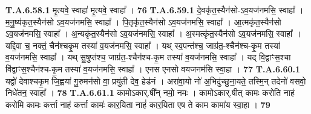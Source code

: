 \documentclass[17pt]{extarticle}
\begin{document}
                  \newline
                                                         \textbf{} \newline \newline
                                \textbf{ T.A.6.58.1} \newline
                  मृ॒त्यवे॒ स्वाहा॑ मृ॒त्यवे॒ स्वाहा᳚ । \textbf{ 76} \newline
                  \newline
                                                         \textbf{} \newline \newline
                                \textbf{ T.A.6.59.1} \newline
                  दे॒वकृ॑त॒स्यैन॑सो-ऽव॒यज॑नमसि॒ स्वाहा᳚ ।  म॒नु॒ष्य॑कृत॒स्यैन॑सो ऽव॒यज॑नमसि॒ स्वाहा᳚ ।  पि॒तृकृ॑त॒स्यैन॑सो ऽव॒यज॑नमसि॒ स्वाहा᳚ ।  आ॒त्मकृ॑त॒स्यैन॑सो ऽव॒यज॑नमसि॒ स्वाहा᳚ ।  अ॒न्यकृ॑त॒स्यैन॑सो ऽव॒यज॑नमसि॒ स्वाहा᳚ ।  अ॒स्मत्कृ॑त॒स्यैन॑सो ऽव॒यज॑नमसि॒ स्वाहा᳚ ।  यद्दि॒वा च॒ नक्तं॒ चैन॑श्चकृ॒म तस्या॑ व॒यज॑नमसि॒ स्वाहा᳚ ।  यथ् स्व॒पन्त॑श्च॒ जाग्र॑त॒-श्चैन॑श्च-कृ॒म तस्या॑ व॒यज॑नमसि॒ स्वाहा᳚ ।  यथ् सु॒षुप्त॑श्च॒ जाग्र॑त॒-श्चैन॑श्च-कृ॒म तस्या॑ व॒यज॑नमसि॒ स्वाहा᳚ ।  यद् वि॒द्वाꣳस॒श्चा वि॑द्वाꣳस॒श्चैन॑श्च-कृ॒म तस्या॑ व॒यज॑नमसि॒ स्वाहा᳚ ।  एनस एनसो वयजनम॑सि स्वा॒हा । \textbf{ 77} \newline
                  \newline
                                                         \textbf{} \newline \newline
                                \textbf{ T.A.6.60.1} \newline
                  यद्वो॑ देवाश्चकृ॒म जि॒ह्वया॑ गु॒रुमन॑सो वा॒ प्रयु॑ती देव॒ हेड॑नं ।  अरा॑वा॒यो नो॑ अ॒भिदु॑च्छुना॒यते॒ तस्मि॒न् तदेनो॑ वसवो॒ निधे॑तन॒ स्वाहा᳚ । \textbf{ 78} \newline
                  \newline
                                                         \textbf{} \newline \newline
                                \textbf{ T.A.6.61.1} \newline
                  कामोऽकार्.षी᳚न् नमो॒ नमः ।  कामोऽकार्.षीत् कामः करोति नाहं करोमि  कामः कर्त्ता नाहं कर्त्ता कामः॑ कार॒यिता नाहं॑ कार॒यिता एष ते काम कामा॑य स्वा॒हा । \textbf{ 79} \newline
                  \newline
\end{document}
